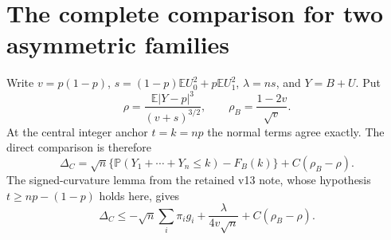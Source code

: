 \documentclass[11pt,a4paper]{article}
\newcommand{\E}{\mathbb E}\newcommand{\Pp}{\mathbb P}
\begin{document}
\section{The complete comparison for two asymmetric families}
Write $v=p(1-p)$, $s=(1-p)\E U_0^2+p\E U_1^2$, $\lambda=ns$,
and $Y=B+U$. Put
\[
 \rho=\frac{\E|Y-p|^3}{(v+s)^{3/2}},\qquad
 \rho_B=\frac{1-2v}{\sqrt v}.
\]
At the central integer anchor $t=k=np$ the normal terms agree exactly.
The direct comparison is therefore
\[
 \Delta_C=\sqrt n\{\Pp(Y_1+\cdots+Y_n\le k)-F_B(k)\}
                       +C(\rho_B-\rho).
\]
The signed-curvature lemma from the retained v13 note, whose hypothesis
$t\ge np-(1-p)$ holds here, gives
\begin{equation}\label{eq:master}
 \Delta_C\le-\sqrt n\sum_i\pi_i g_i
             +\frac{\lambda}{4v\sqrt n}+C(\rho_B-\rho).
\end{equation}
\end{document}
